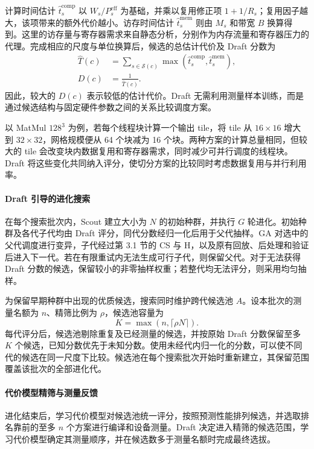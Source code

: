 \documentclass[11pt,twocolumn]{ctexart}
\begin{document}
计算时间估计 $\widehat t_s^{\mathrm{comp}}$ 以 $W_s/P_s^{\mathrm{eff}}$ 为基础，并乘以复用修正项 $1+1/R_s$；复用因子越大，该项带来的额外代价越小。访存时间估计 $\widehat t_s^{\mathrm{mem}}$ 则由 $M_s$ 和带宽 $B$ 换算得到。这里的访存量与寄存器需求来自静态分析，分别作为内存流量和寄存器压力的代理。完成相应的尺度与单位换算后，候选的总估计代价及 Draft 分数为
\begin{equation}
\begin{aligned}
\widehat T(c)&=\sum_{s\in\mathcal S(c)}
\max\!\left(\widehat t_s^{\mathrm{comp}},\widehat t_s^{\mathrm{mem}}\right),\\
D(c)&=\frac{1}{\widehat T(c)}.
\end{aligned}
\label{eq:analytic}
\end{equation}
因此，较大的 $D(c)$ 表示较低的估计代价。Draft 无需利用测量样本训练，而是通过候选结构与固定硬件参数之间的关系比较调度方案。

以 MatMul $128^3$ 为例，若每个线程块计算一个输出 tile，将 tile 从 $16\times16$ 增大到 $32\times32$，网格规模便从 64 个块减为 16 个块。两种方案的计算总量相同，但较大的 tile 会改变块内数据复用和寄存器需求，同时减少可并行调度的线程块。Draft 将这些变化共同纳入评分，使切分方案的比较同时考虑数据复用与并行利用率。

\paragraph{Draft 引导的进化搜索}
在每个搜索批次内，Scout 建立大小为 $N$ 的初始种群，并执行 $G$ 轮进化。初始种群及各代子代均由 Draft 评分，同代分数经归一化后用于父代抽样。GA 对选中的父代调度进行变异，子代经过第 3.1 节的 CS 与 H，以及原有回放、后处理和验证后进入下一代。若在有限重试内无法生成可行子代，则保留父代。对于无法获得 Draft 分数的候选，保留较小的非零抽样权重；若整代均无法评分，则采用均匀抽样。

为保留早期种群中出现的优质候选，搜索同时维护跨代候选池 $A$。设本批次的测量名额为 $n$、精筛比例为 $\rho$，候选池容量为
\begin{equation}
K=\max\!\left(n,\lceil\rho N\rceil\right).
\label{eq:graded-pool}
\end{equation}
每代评分后，候选池剔除重复及已经测量的候选，并按原始 Draft 分数保留至多 $K$ 个候选，已知分数优先于未知分数。使用未经代内归一化的分数，可以使不同代的候选在同一尺度下比较。候选池在每个搜索批次开始时重新建立，其保留范围覆盖该批次的全部进化代。

\paragraph{代价模型精筛与测量反馈}
进化结束后，学习代价模型对候选池统一评分，按照预测性能排列候选，并选取排名靠前的至多 $n$ 个方案进行编译和设备测量。Draft 决定进入精筛的候选范围，学习代价模型确定其测量顺序，并在候选数多于测量名额时完成最终选拔。
\end{document}
